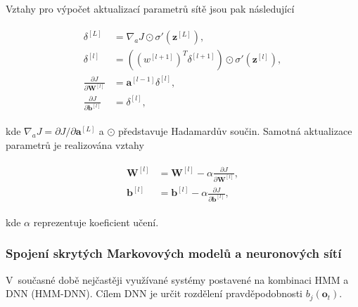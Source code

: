 \noindent Vztahy pro výpočet aktualizací parametrů sítě jsou pak následující

\begin{align}
  \begin{split}
    \delta^{[L]} & = \nabla_{a} J \odot \sigma'\left(\mathbf{z}^{[L]}\right), \\
    \delta^{[l]} & = \left(\left(w^{[l+1]}\right)^T \delta^{[l+1]}\right) \odot \sigma'\left(\mathbf{z}^{[l]}\right), \\
    \frac{\partial J}{\partial \mathbf{W}^{[l]}} & = \mathbf{a}^{[l-1]}\delta^{[l]}, \\
    \frac{\partial J}{\partial \mathbf{b}^{[l]}} & = \delta^{[l]},
  \end{split}
  \label{eq:asr:acoustic:dnn:bp}
\end{align}

\noindent kde $\nabla_a J = \partial J / \partial \mathbf{a}^{[L]}$ a $\odot$ představuje Hadamardův součin. Samotná aktualizace parametrů je realizována vztahy

\begin{align}
  \begin{split}
    \mathbf{W}^{[l]} & = \mathbf{W}^{[l]} - \alpha \frac{\partial J}{\partial \mathbf{W}^{[l]}}, \\
    \mathbf{b}^{[l]} & = \mathbf{b}^{[l]} - \alpha \frac{\partial J}{\partial \mathbf{b}^{[l]}},
  \end{split}
  \label{eq:asr:acoustic:dnn:update}
\end{align}

\noindent kde $\alpha$ reprezentuje koeficient učení.

\subsubsection{Spojení skrytých Markovových modelů a neuronových sítí}

V~současné době nejčastěji využívané systémy postavené na kombinaci HMM a DNN (HMM-DNN).
Cílem DNN
je určit rozdělení pravděpodobnosti $b_j\left(\boldsymbol{o}_t\right)$.

